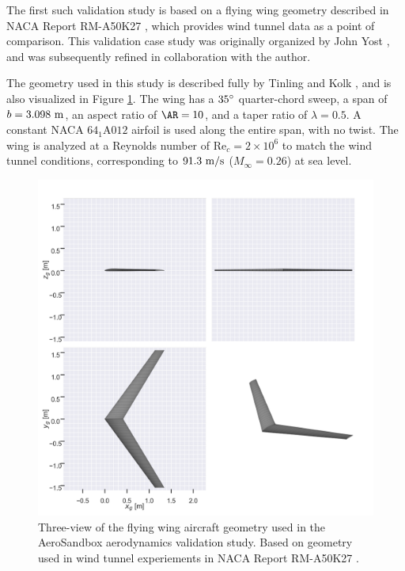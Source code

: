 The first such validation study is based on a flying wing geometry described in NACA Report RM-A50K27 \cite{tinling_effects_1951}, which provides wind tunnel data as a point of comparison. This validation case study was originally organized by John Yost \cite{yost2022}, and was subsequently refined in collaboration with the author.

The geometry used in this study is described fully by Tinling and Kolk \cite{tinling_effects_1951}, and is also visualized in Figure \ref{fig:fw_geometry}. The wing has a $35\degree$ quarter-chord sweep, a span of $b=3.098\ \rm m$, an aspect ratio of $\AR = 10$, and a taper ratio of $\lambda=0.5$. A constant NACA $\mathrm{64_{1}A012}$ airfoil is used along the entire span, with no twist. The wing is analyzed at a Reynolds number of $\text{Re}_c=2 \times 10^6$ to match the wind tunnel conditions, corresponding to $91.3\ \rm m/s$ ($M_\infty=0.26$) at sea level.

\begin{figure}[!htb]
    \centering
    \includegraphics[width=5in]{../figures/aero_validation/flying_wing_geometry.png}
    \caption{Three-view of the flying wing aircraft geometry used in the AeroSandbox aerodynamics validation study. Based on geometry used in wind tunnel experiements in NACA Report RM-A50K27 \cite{tinling_effects_1951}.}
    \label{fig:fw_geometry}
\end{figure}

